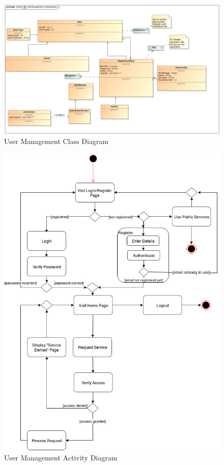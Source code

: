 \documentclass[11pt]{article}
\begin{document}
	
    \begin{figure}[!h]
        \centering
        \includegraphics[width=\textwidth]{Diagrams/UserManagement/UserManagement_ClassDiagram}
        \caption{User Management Class Diagram}
        \label{fig:user_class}
    \end{figure}
    \begin{figure}[!h]
        \centering
        \includegraphics[width=\textwidth]{Diagrams/UserManagement/UseActivityDiagram}
        \caption{User Management Activity Diagram}
        \label{fig:user_activity}
    \end{figure}
\end{document}
